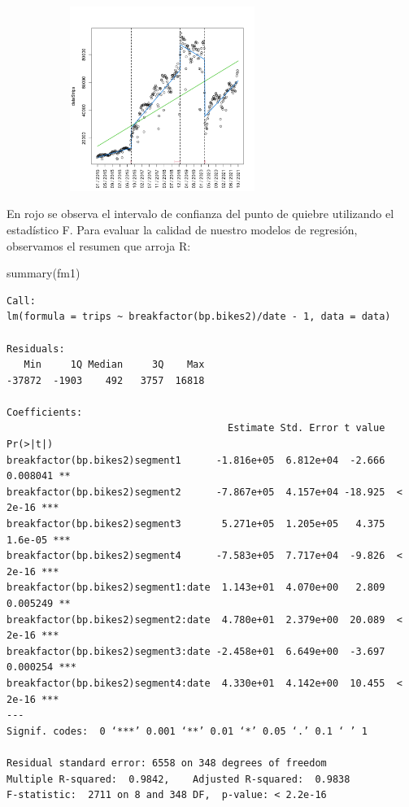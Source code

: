 \documentclass[
]{article}
\newenvironment{Shaded}{}{}
\newcommand{\FunctionTok}[1]{\textcolor[rgb]{0.02,0.16,0.49}{#1}}
\newcommand{\NormalTok}[1]{#1}
\begin{document}
\begin{figure}[h]
\centering
\includegraphics[width=8cm, height=6cm]{../plots/structChange_files/structChange_17_4.png}
\caption{}
\end{figure}

En rojo se observa el intervalo de confianza del punto de quiebre
utilizando el estadístico F. Para evaluar la calidad de nuestro modelos
de regresión, observamos el resumen que arroja R:

\begin{Shaded}
\begin{Highlighting}[]
\FunctionTok{summary}\NormalTok{(fm1)}
\end{Highlighting}
\end{Shaded}

\begin{verbatim}
Call:
lm(formula = trips ~ breakfactor(bp.bikes2)/date - 1, data = data)

Residuals:
   Min     1Q Median     3Q    Max
-37872  -1903    492   3757  16818

Coefficients:
                                      Estimate Std. Error t value Pr(>|t|)
breakfactor(bp.bikes2)segment1      -1.816e+05  6.812e+04  -2.666 0.008041 **
breakfactor(bp.bikes2)segment2      -7.867e+05  4.157e+04 -18.925  < 2e-16 ***
breakfactor(bp.bikes2)segment3       5.271e+05  1.205e+05   4.375  1.6e-05 ***
breakfactor(bp.bikes2)segment4      -7.583e+05  7.717e+04  -9.826  < 2e-16 ***
breakfactor(bp.bikes2)segment1:date  1.143e+01  4.070e+00   2.809 0.005249 **
breakfactor(bp.bikes2)segment2:date  4.780e+01  2.379e+00  20.089  < 2e-16 ***
breakfactor(bp.bikes2)segment3:date -2.458e+01  6.649e+00  -3.697 0.000254 ***
breakfactor(bp.bikes2)segment4:date  4.330e+01  4.142e+00  10.455  < 2e-16 ***
---
Signif. codes:  0 ‘***’ 0.001 ‘**’ 0.01 ‘*’ 0.05 ‘.’ 0.1 ‘ ’ 1

Residual standard error: 6558 on 348 degrees of freedom
Multiple R-squared:  0.9842,	Adjusted R-squared:  0.9838
F-statistic:  2711 on 8 and 348 DF,  p-value: < 2.2e-16
\end{verbatim}
\end{document}
